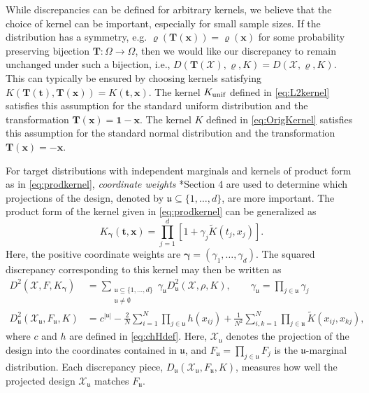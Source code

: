 \documentclass[graybox]{svmult}
\newcommand{\vx}{\boldsymbol{x}}
\newcommand{\vt}{\boldsymbol{t}}
\newcommand{\fraku}{\mathfrak{u}}
\newcommand{\Xdes}{\mathcal{X}}
\newcommand{\unif}{\textup{unif}}
\newcommand{\tK}{\widetilde{K}}
\newcommand{\vT}{\boldsymbol{T}}
\newcommand{\vone}{\boldsymbol{1}}
\newcommand{\vgamma}{\boldsymbol{\gamma}}
\def\abs#1{\ensuremath{\left \lvert #1 \right \rvert}}
\begin{document}
While discrepancies can be defined for arbitrary kernels, we believe that the choice of kernel can be important, especially for small sample sizes.  If the distribution has a symmetry, e.g. $\varrho(\vT(\vx)) = \varrho(\vx)$ for some probability preserving bijection $\vT:\Omega \to \Omega$, then we would like our discrepancy to remain unchanged under such a bijection, i.e., $D(\vT(\Xdes),\varrho,K) = D(\Xdes,\varrho,K)$.  This can typically be ensured by choosing kernels satisfying $K(\vT(\vt),\vT(\vx)) = K(\vt,\vx)$.   The kernel $K_\unif$ defined in \eqref{eq:L2kernel} satisfies this assumption for the standard uniform distribution and the transformation $\vT(\vx) = \vone - \vx$.  The kernel $K$ defined in \eqref{eq:OrigKernel} satisfies this assumption for the standard normal distribution and the transformation $\vT(\vx) = -\vx$.

For target distributions with independent marginals and kernels of product form as in \eqref{eq:prodkernel}, \emph{coordinate weights} \cite{DicEtal14a}*{Section 4} are used to determine which projections of the design, denoted by $\fraku \subseteq \{1, \ldots, d\}$, are more important.  The product form of the kernel given in \eqref{eq:prodkernel} can be generalized as 
\begin{equation*} %
     K_{\vgamma}(\vt,\vx)  = \prod_{j=1}^d\left[1+ \gamma_j \tK(t_j,x_j) \right].
\end{equation*}
Here, the positive coordinate weights are $\vgamma = (\gamma_1, \ldots, \gamma_d)$.
The squared discrepancy corresponding to this kernel may then be written as
\begin{align*}
      D^2(\Xdes,F,K_{\vgamma}) &= \sum_{\substack{\fraku \subseteq \{1, \ldots, d\} \\ \fraku \ne \emptyset}}\gamma_\fraku D^2_{\fraku} (\Xdes,\rho,K), \qquad \gamma_{\fraku} = \prod_{j \in \fraku} \gamma_j\\
    D^2_{\fraku} (\Xdes_\fraku,F_\fraku,K) & = c^{\abs{\fraku}} - \frac 2N \sum_{i=1}^N \prod_{j \in \fraku} h(x_{ij}) + \frac{1}{N^2} \sum_{i,k=1}^N \prod_{j \in \fraku} \tK(x_{ij},x_{kj}),
\end{align*}
where $c$ and $h$ are defined in \eqref{eq:chHdef}. Here, $\Xdes_\fraku$ denotes the projection of the design into the coordinates contained in $\fraku$, and $F_\fraku = \prod_{j \in \fraku} F_j$ is the $\fraku$-marginal distribution.  Each discrepancy piece, $D_{\fraku} (\Xdes_\fraku,F_\fraku,K)$, measures how well the projected design $\Xdes_\fraku$ matches $F_\fraku$. 
\end{document}

